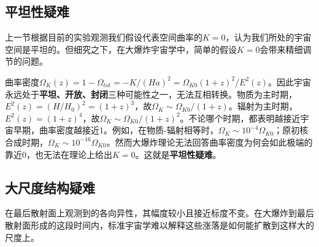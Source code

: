 \subsection{平坦性疑难}
上一节根据目前的实验观测我们假设代表空间曲率的$K=0$，认为我们所处的宇宙空间是平坦的。但细究之下，在大爆炸宇宙学中，简单的假设$K=0$会带来精细调节的问题。

曲率密度$\Omega_K(z) =
1-\Omega_{tot}=-K /{\left(Ha\right)}^2=\Omega_{K
0}{\left(1+z\right)}^2
/E^2(z)$。因此宇宙永远处于\textbf{平坦、开放、封闭}三种可能性之一，无法互相转换。物质为主时期，$E^2(z)={\left(H
/H_0\right)}^2={\left(1+z\right)}^3$，故$\Omega_K\sim \Omega_{K
0}
/{\left(1+z\right)}$。辐射为主时期，$E^2(z)={\left(1+z\right)}^{4}$，故$\Omega_K\sim\Omega_{K
0}
/{\left(1+z\right)}^2$。不论哪个时期，都表明越接近宇宙早期，曲率密度越接近$1$。例如，在物质-辐射相等时，$\Omega_K\sim
10^{-4}\Omega_{K 0}$；原初核合成时期，$\Omega_K\sim 10^{-16}\Omega_{K
0}$。然而大爆炸理论无法回答曲率密度为何会如此极端的靠近$0$，也无法在理论上给出$K=0$。这就是\textbf{平坦性疑难}。

\subsection{大尺度结构疑难}
在最后散射面上观测到的各向异性，其幅度较小且接近标度不变。在大爆炸到最后散射面形成的这段时间内，标准宇宙学难以解释这些涨落是如何能扩散到这样大的尺度上。
